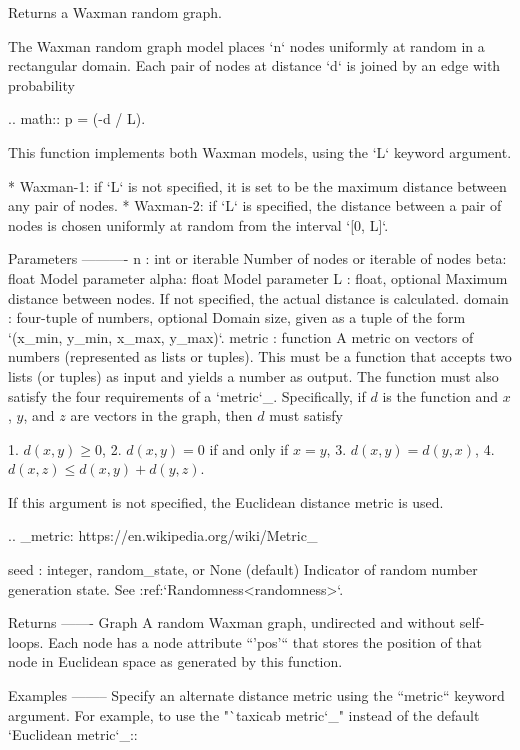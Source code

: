 \begin{DoxyVerb}Returns a Waxman random graph.

The Waxman random graph model places `n` nodes uniformly at random
in a rectangular domain. Each pair of nodes at distance `d` is
joined by an edge with probability

.. math::
        p = \beta \exp(-d / \alpha L).

This function implements both Waxman models, using the `L` keyword
argument.

* Waxman-1: if `L` is not specified, it is set to be the maximum distance
  between any pair of nodes.
* Waxman-2: if `L` is specified, the distance between a pair of nodes is
  chosen uniformly at random from the interval `[0, L]`.

Parameters
----------
n : int or iterable
    Number of nodes or iterable of nodes
beta: float
    Model parameter
alpha: float
    Model parameter
L : float, optional
    Maximum distance between nodes.  If not specified, the actual distance
    is calculated.
domain : four-tuple of numbers, optional
    Domain size, given as a tuple of the form `(x_min, y_min, x_max,
    y_max)`.
metric : function
    A metric on vectors of numbers (represented as lists or
    tuples). This must be a function that accepts two lists (or
    tuples) as input and yields a number as output. The function
    must also satisfy the four requirements of a `metric`_.
    Specifically, if $d$ is the function and $x$, $y$,
    and $z$ are vectors in the graph, then $d$ must satisfy

    1. $d(x, y) \ge 0$,
    2. $d(x, y) = 0$ if and only if $x = y$,
    3. $d(x, y) = d(y, x)$,
    4. $d(x, z) \le d(x, y) + d(y, z)$.

    If this argument is not specified, the Euclidean distance metric is
    used.

    .. _metric: https://en.wikipedia.org/wiki/Metric_%

seed : integer, random_state, or None (default)
    Indicator of random number generation state.
    See :ref:`Randomness<randomness>`.

Returns
-------
Graph
    A random Waxman graph, undirected and without self-loops. Each
    node has a node attribute ``'pos'`` that stores the position of
    that node in Euclidean space as generated by this function.

Examples
--------
Specify an alternate distance metric using the ``metric`` keyword
argument. For example, to use the "`taxicab metric`_" instead of the
default `Euclidean metric`_::


\end{DoxyVerb}
